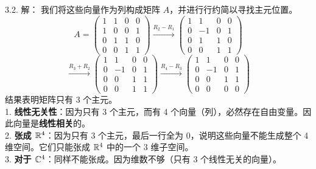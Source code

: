 \begin{exer}
3.2. 解：
我们将这些向量作为列构成矩阵 $A$，并进行行约简以寻找主元位置。
$$ A = \begin{pmatrix} 1 & 1 & 0 & 0 \\ 1 & 0 & 0 & 1 \\ 0 & 1 & 1 & 0 \\ 0 & 0 & 1 & 1 \end{pmatrix}
\xrightarrow{R_2 - R_1}
 \begin{pmatrix} 1 & 1 & 0 & 0 \\ 0 & -1 & 0 & 1 \\ 0 & 1 & 1 & 0 \\ 0 & 0 & 1 & 1 \end{pmatrix}
$$ $$\xrightarrow{R_3 + R_2}
 \begin{pmatrix} 1 & 1 & 0 & 0 \\ 0 & -1 & 0 & 1 \\ 0 & 0 & 1 & 1 \\ 0 & 0 & 1 & 1 \end{pmatrix}
\xrightarrow{R_4 - R_3}
 \begin{pmatrix} 1 & 1 & 0 & 0 \\ 0 & -1 & 0 & 1 \\ 0 & 0 & 1 & 1 \\ 0 & 0 & 0 & 0 \end{pmatrix} $$
结果表明矩阵只有 3 个主元。\\
1. \textbf{线性无关性}：因为只有 3 个主元，而有 4 个向量（列），必然存在自由变量。因此向量是\textbf{线性相关}的。\\
2. \textbf{张成 $\mathbb{R}^4$}：因为只有 3 个主元，最后一行全为 0，说明这些向量不能生成整个 4 维空间。它们只能张成 $\mathbb{R}^4$ 中的一个 3 维子空间。\\
3. \textbf{对于 $\mathbb{C}^4$}：同样不能张成。因为维数不够（只有 3 个线性无关的向量）。


\end{exer}
